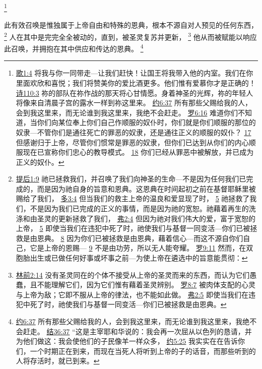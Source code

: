 \documentclass[12pt, a4paper, oneside]{ctexart}
\newcounter{parnum}[section]
\newcommand{\N}{%
   \noindent\refstepcounter{parnum}%
    \makebox[\parindent][l]{\textbf{\arabic{parnum}.}}}
\begin{document}
	\footnote {
		\href{https://biblehub.com/songs/1-4.htm}{歌1:4} 将我与你一同带走---让我们赶快！让国王将我带入他的内室。我们在你里面欢欣和喜悦；我们将赞美你的爱比酒更多。他们惟有爱慕你才是正确的！
		\href{https://biblehub.com/psalms/110-3.htm}{诗110:3} 祢的部队在祢作战的那天将心甘情愿。身着神圣的光辉，祢的年轻人将像来自清晨子宫的露水一样到祢这里来。
		\href{https://biblehub.com/john/6-37.htm}{约6:37} 所有那些父赐给我的人，会到我这里来，而无论谁到我这里来，我绝不会赶走。
		\href{https://biblehub.com/romans/6-16.htm}{罗6:16} 难道你们不知道，当你们向某位奉上你们自己作顺服的奴仆时，你们就是你们顺服的那位的奴隶---不管你们是通往死亡的罪恶的奴隶，还是通往正义的顺服的奴仆？
		\href{https://biblehub.com/romans/6-17.htm}{17} 但感谢归于上帝，尽管你们惯常是罪恶的奴隶，但你们已达到从你们的内心顺服现在已宣称你们忠心的教导模式。
		\href{https://biblehub.com/romans/6-18.htm}{18} 你们已经从罪恶中被解放，并已成为正义的奴仆。
	}

\N 此有效召唤是惟独属于上帝自由和特殊的恩典，根本不源自对人预见的任何东西，
	\footnote {
		\href{https://biblehub.com/2_timothy/1-9.htm}{提后1:9} 祂已拯救我们，并召唤了我们向神圣的生命---不是因为任何我们已完成的，而是因为祂自身的旨意和恩典。这恩典在时间起初之前在基督耶稣里被赐给了我们，
		\href{https://biblehub.com/titus/3-4.htm}{多3:4} 但当我们的救主上帝的温良和爱显现了时，
		\href{https://biblehub.com/titus/3-5.htm}{5} 祂拯救了我们，不是因为我们已完成的正义的事情，而是因为祂的宽恕。祂藉着再生的洗涤和由圣灵的更新拯救了我们，
		\href{https://biblehub.com/ephesians/2-4.htm}{弗2:4} 但因为祂对我们伟大的爱，富于宽恕的上帝，
		\href{https://biblehub.com/ephesians/2-5.htm}{5} 即使当我们在违犯中死了时，祂使我们与基督一同变活---你们已被拯救是由恩典。
		\href{https://biblehub.com/ephesians/2-8.htm}{8} 因为你们已被拯救是由恩典，藉着信心---而这不源自你们自己，它是上帝的恩赐---
		\href{https://biblehub.com/ephesians/2-9.htm}{9} 不是由功劳，所以无人能夸耀。
		\href{https://biblehub.com/romans/9-11.htm}{罗9:11} 然而，在双胞胎出生或已做任何好事或坏事之前---为使上帝在遴选中的旨意能贯彻：
	}
	人在其中是完完全全被动的，直到，被圣灵复苏并更新，
	\footnote {
		\href{https://biblehub.com/1_corinthians/2-14.htm}{林前2:14} 没有圣灵同在的个体不接受从上帝的圣灵而来的东西，而认为它们愚蠢，且不能理解它们，因为它们惟有藉着圣灵辨别。
		\href{https://biblehub.com/romans/8-7.htm}{罗8:7} 被肉体支配的心灵与上帝为敌；它即不服从上帝的律法，也不能如此做。
		\href{https://biblehub.com/ephesians/2-5.htm}{弗2:5} 即使当我们在违犯中死了时，祂使我们与基督一同变活---你们已被拯救是由恩典。
	}
	他从而被赋能以响应此召唤，并拥抱在其中供应和传达的恩典。
	\footnote {
		\href{https://biblehub.com/john/6-37.htm}{约6:37} 所有那些父赐给我的人，会到我这里来，而无论谁到我这里来，我绝不会赶走。
		\href{https://biblehub.com/ezekiel/36-37.htm}{结36:37} “这是主宰耶和华说的：我会再一次屈从以色列的恳请，并为他们做这：我会使他们的子民像羊一样众多，
		\href{https://biblehub.com/john/5-25.htm}{约5:25} 我实实在在告诉你们，一个时期正在到来，而现在当死人将听到上帝的子的话音，而那些听到的人将存活时，就已到来。
	}
\end{document}
